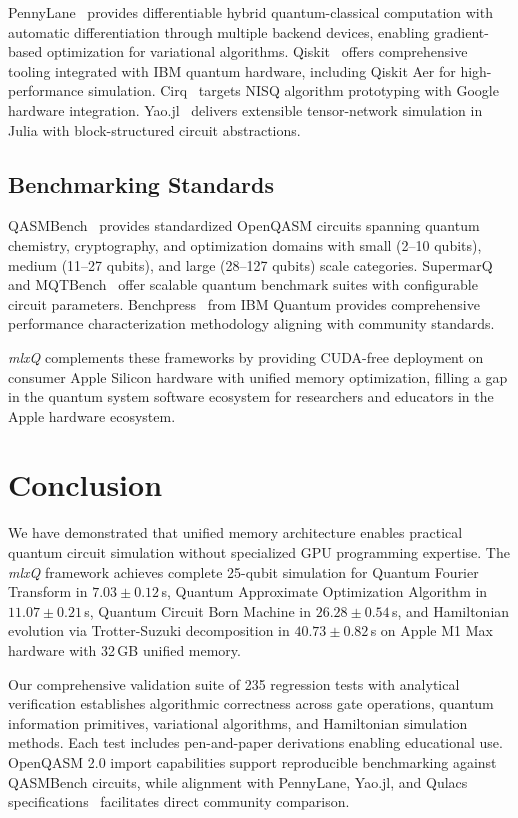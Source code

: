 \documentclass[runningheads]{llncs}
\newcommand{\mlxquantum}{\textit{mlxQ}\xspace}
\begin{document}
PennyLane~\cite{PennyLane2022} provides differentiable hybrid quantum-classical computation with automatic differentiation through multiple backend devices, enabling gradient-based optimization for variational algorithms. Qiskit~\cite{Qiskit2023} offers comprehensive tooling integrated with IBM quantum hardware, including Qiskit Aer for high-performance simulation. Cirq~\cite{Cirq2024} targets NISQ algorithm prototyping with Google hardware integration. Yao.jl~\cite{YaoJL2024} delivers extensible tensor-network simulation in Julia with block-structured circuit abstractions.

\subsection{Benchmarking Standards}

QASMBench~\cite{QASMBench2020} provides standardized OpenQASM circuits spanning quantum chemistry, cryptography, and optimization domains with small (2--10 qubits), medium (11--27 qubits), and large (28--127 qubits) scale categories. SupermarQ~\cite{SupermarQ2022} and MQTBench~\cite{MQTBench2022} offer scalable quantum benchmark suites with configurable circuit parameters. Benchpress~\cite{Benchpress2024} from IBM Quantum provides comprehensive performance characterization methodology aligning with community standards.

\mlxquantum complements these frameworks by providing CUDA-free deployment on consumer Apple Silicon hardware with unified memory optimization, filling a gap in the quantum system software ecosystem for researchers and educators in the Apple hardware ecosystem.

\section{Conclusion}

We have demonstrated that unified memory architecture enables practical quantum circuit simulation without specialized GPU programming expertise. The \mlxquantum framework achieves complete 25-qubit simulation for Quantum Fourier Transform in $7.03\pm0.12$\,s, Quantum Approximate Optimization Algorithm in $11.07\pm0.21$\,s, Quantum Circuit Born Machine in $26.28\pm0.54$\,s, and Hamiltonian evolution via Trotter-Suzuki decomposition in $40.73\pm0.82$\,s on Apple M1 Max hardware with 32\,GB unified memory.

Our comprehensive validation suite of 235 regression tests with analytical verification establishes algorithmic correctness across gate operations, quantum information primitives, variational algorithms, and Hamiltonian simulation methods. Each test includes pen-and-paper derivations enabling educational use. OpenQASM 2.0 import capabilities support reproducible benchmarking against QASMBench circuits, while alignment with PennyLane, Yao.jl, and Qulacs specifications~\cite{PennyLane2022,YaoJL2024,Qulacs} facilitates direct community comparison.
\end{document}
